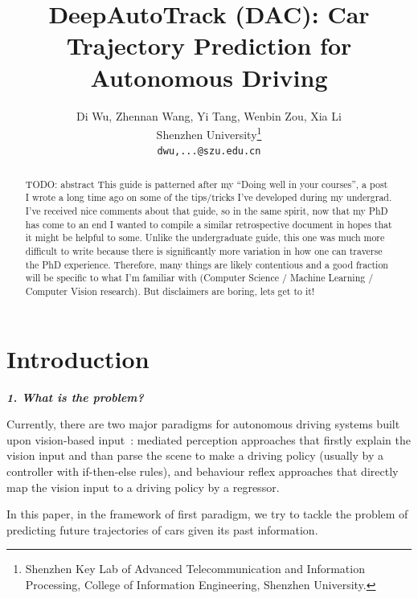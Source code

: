 \documentclass[10pt,twocolumn,letterpaper]{article}
\begin{document}
\title{DeepAutoTrack (DAC): Car Trajectory Prediction for Autonomous Driving}

\author{Di Wu, Zhennan Wang, Yi Tang,  Wenbin Zou, Xia Li\\
Shenzhen University\thanks{Shenzhen Key Lab of Advanced Telecommunication and Information Processing, College of Information Engineering, Shenzhen University.}\\
{\tt\small dwu,...@szu.edu.cn}}
\maketitle
\begin{abstract}
TODO: abstract
This guide is patterned after my “Doing well in your courses”, a post I wrote a long time ago on some of the tips/tricks I’ve developed during my undergrad. I’ve received nice comments about that guide, so in the same spirit, now that my PhD has come to an end I wanted to compile a similar retrospective document in hopes that it might be helpful to some. Unlike the undergraduate guide, this one was much more difficult to write because there is significantly more variation in how one can traverse the PhD experience. Therefore, many things are likely contentious and a good fraction will be specific to what I’m familiar with (Computer Science / Machine Learning / Computer Vision research). But disclaimers are boring, lets get to it!
\end{abstract}
\section{Introduction}



\textbf{\emph{1. What is the problem?}}

Currently, there are two major paradigms for autonomous driving systems built upon vision-based input~\cite{chen2015deepdriving}: mediated perception approaches that firstly explain the vision input and than parse the scene to make a driving policy (usually by a controller with if-then-else rules), and behaviour reflex approaches that directly map the vision input to a driving policy by a regressor.

In this paper, in the framework of first paradigm, we try to tackle the problem of predicting future trajectories of cars given its past information.
\end{document}
